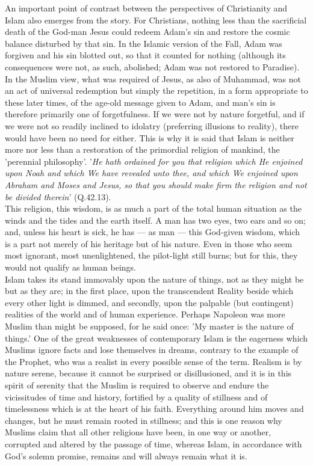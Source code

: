 \documentclass[10pt, twoside,openright]{book}
\begin{document}
An important point of contrast between the perspectives of Christianity and Islam also emerges from 
the story. For Christians, nothing less than the sacrificial death of the God\hyp{}man Jesus could redeem 
Adam's sin and restore the cosmic balance disturbed by that sin. In the Islamic version of the Fall, 
Adam was forgiven and his sin blotted out, so that it counted for nothing (although its consequences 
were not, as such, abolished; Adam was not restored to Paradise). In the Muslim view, what was 
required of Jesus, as also of Muhammad, was not an act of universal redemption but simply the 
repetition, in a form appropriate to these later times, of the age\hyp{}old message given to Adam, and 
man's sin is therefore primarily one of forgetfulness. If we were not by nature forgetful, and if we 
were not so readily inclined to idolatry (preferring illusions to reality), there would have been no 
need for either. This is why it is said that Islam is neither more nor less than a restoration of the 
primordial religion of mankind, the 'perennial philosophy'. '\emph{He hath ordained for you that religion 
which He enjoined upon Noah and which We have revealed unto thee, and which We enjoined upon Abraham and Moses and Jesus, so that you should make firm the religion and not be divided therein}' (Q.42.13).\\

This religion, this wisdom, is as much a part of the total human situation as the winds and the tides 
and the earth itself. A man has two eyes, two ears and so on; and, unless his heart is sick, he has --- 
as man --- this God\hyp{}given wisdom, which is a part not merely of his heritage but of his nature. Even in 
those who seem most ignorant, most unenlightened, the pilot-light still burns; but for this, they 
would not qualify as human beings. \\

Islam takes its stand immovably upon the nature of things, not as they might be but as they are; in 
the first place, upon the transcendent Reality beside which every other light is dimmed, and 
secondly, upon the palpable (but contingent) realities of the world and of human experience. Perhaps 
Napoleon was more Muslim than might be supposed, for he said once: 'My master is the nature of things.' One of the great weaknesses of contemporary Islam is the eagerness which Muslims ignore facts and lose themselves in dreams, contrary to the example of the Prophet, who was a realist in every possible sense of the term. Realism is by nature serene, because it cannot be surprised or disillusioned, and it is in this spirit of serenity that the Muslim is required to observe and endure the vicissitudes of time and history, fortified by a quality of stillness and of timelessness which is at the heart of his faith. Everything around him moves and changes, but he must remain rooted in stillness; and this is one reason why Muslims claim that all other religions have been, in one way or another, corrupted and altered by the passage of time, whereas Islam, in accordance with God's solemn promise, remains and will always remain what it is. \\
\end{document}
